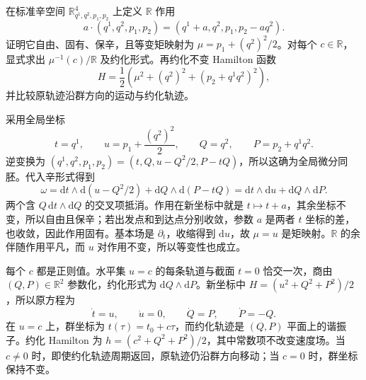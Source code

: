 \begin{exercise}\label{g4:ex:1002:nonlinear-translation-reduction}
	在标准辛空间 \(\mathbb R^4_{q^1,q^2,p_1,p_2}\) 上定义 \(\mathbb R\) 作用
	\[
		a\cdot(q^1,q^2,p_1,p_2)
		=(q^1+a,q^2,p_1,p_2-aq^2).
	\]
	证明它自由、固有、保辛，且等变矩映射为 \(\mu=p_1+(q^2)^2/2\)。对每个 \(c\in\mathbb R\)，显式求出 \(\mu^{-1}(c)/\mathbb R\) 及约化形式。再约化不变 Hamilton 函数
	\[
		H=\frac12\left(\mu^2+(q^2)^2+(p_2+q^1q^2)^2\right),
	\]
	并比较原轨迹沿群方向的运动与约化轨迹。
\end{exercise}
\begin{solution}
	采用全局坐标
	\[
		t=q^1,\qquad u=p_1+\frac{(q^2)^2}{2},
		\qquad Q=q^2,\qquad P=p_2+q^1q^2.
	\]
	逆变换为 \((q^1,q^2,p_1,p_2)=(t,Q,u-Q^2/2,P-tQ)\)，所以这确为全局微分同胚。代入辛形式得到
	\[
		\omega=\mathrm{d}t\wedge\mathrm{d}(u-Q^2/2)
		+\mathrm{d}Q\wedge\mathrm{d}(P-tQ)
		=\mathrm{d}t\wedge\mathrm{d}u+\mathrm{d}Q\wedge\mathrm{d}P.
	\]
	两个含 \(Q\,\mathrm{d}t\wedge\mathrm{d}Q\) 的交叉项抵消。作用在新坐标中就是 \(t\mapsto t+a\)，其余坐标不变，所以自由且保辛；若出发点和到达点分别收敛，参数 \(a\) 是两者 \(t\) 坐标的差，也收敛，因此作用固有。基本场是 \(\partial_t\)，收缩得到 \(\mathrm{d}u\)，故 \(\mu=u\) 是矩映射。\(\mathbb R\) 的余伴随作用平凡，而 \(u\) 对作用不变，所以等变性也成立。

	每个 \(c\) 都是正则值。水平集 \(u=c\) 的每条轨道与截面 \(t=0\) 恰交一次，商由 \((Q,P)\in\mathbb R^2\) 参数化，约化形式为 \(\mathrm{d}Q\wedge\mathrm{d}P\)。新坐标中 \(H=(u^2+Q^2+P^2)/2\)，所以原方程为
	\[
		\dot t=u,\qquad\dot u=0,\qquad
		\dot Q=P,\qquad\dot P=-Q.
	\]
	在 \(u=c\) 上，群坐标为 \(t(\tau)=t_0+c\tau\)，而约化轨迹是 \((Q,P)\) 平面上的谐振子。约化 Hamilton 为 \(h=(c^2+Q^2+P^2)/2\)，其中常数项不改变速度场。当 \(c\ne0\) 时，即使约化轨迹周期返回，原轨迹仍沿群方向移动；当 \(c=0\) 时，群坐标保持不变。
\end{solution}

